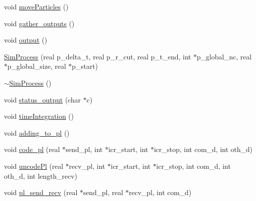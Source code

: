 \begin{DoxyCompactItemize}
\item 
void \hyperlink{class_sim_process_a0f5eea6cd2b560579fe1c0beeedc702d}{move\-Particles} ()
\item 
void \hyperlink{class_sim_process_a12d27ec08b5c192165a6ecb79c6aec4c}{gather\-\_\-outputs} ()
\item 
void \hyperlink{class_sim_process_af36c4baf32518f1460d0784ebbf6b50e}{output} ()
\item 
\hyperlink{class_sim_process_abdc4e29101d4abb10b8436aeaef77d46}{Sim\-Process} (real p\-\_\-delta\-\_\-t, real p\-\_\-r\-\_\-cut, real p\-\_\-t\-\_\-end, int $\ast$p\-\_\-global\-\_\-nc, real $\ast$p\-\_\-global\-\_\-size, real $\ast$p\-\_\-start)
\item 
\hyperlink{class_sim_process_a0f05e54804a935e6fbafb601efe33a7c}{$\sim$\-Sim\-Process} ()
\item 
void \hyperlink{class_sim_process_a5c26a474aaafe823f5b31a12e01d61b2}{status\-\_\-output} (char $\ast$c)
\item 
void \hyperlink{class_sim_process_ab193bf6bb9d89e122127b015cd900ff2}{time\-Integration} ()
\item 
void \hyperlink{class_sim_process_a8544f52c47dc17cf8ab85edd12ea77c5}{adding\-\_\-to\-\_\-pl} ()
\item 
void \hyperlink{class_sim_process_a004ae491059a84c4a3bd5d715e6f47ab}{code\-\_\-pl} (real $\ast$send\-\_\-pl, int $\ast$icr\-\_\-start, int $\ast$icr\-\_\-stop, int com\-\_\-d, int oth\-\_\-d)
\item 
void \hyperlink{class_sim_process_a3cb98183aafbb9faa5c41308591313f3}{uncode\-Pl} (real $\ast$recv\-\_\-pl, int $\ast$icr\-\_\-start, int $\ast$icr\-\_\-stop, int com\-\_\-d, int oth\-\_\-d, int length\-\_\-recv)
\item 
void \hyperlink{class_sim_process_a32261e45b09042ec658c84d0638bc5b1}{pl\-\_\-send\-\_\-recv} (real $\ast$send\-\_\-pl, real $\ast$recv\-\_\-pl, int com\-\_\-d)
\end{DoxyCompactItemize}
